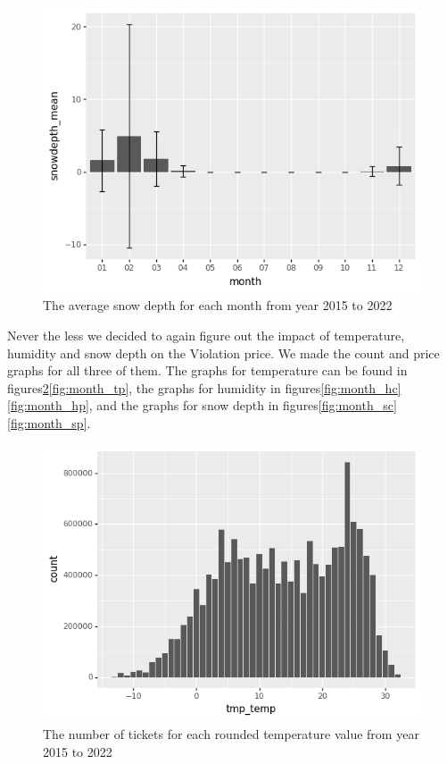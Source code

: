 \documentclass[12pt]{fphw}
\begin{document}
\begin{figure}[h!]
  \label{fig:month_s}
  \includegraphics[width=1\textwidth]{figures2/Month_snowdepth.png}
  \caption{The average snow depth for each month from year 2015 to 2022}
\end{figure}


Never the less we decided to again figure out the impact of temperature, humidity and snow depth on the Violation price.
We made the count and price graphs for all three of them. The graphs for temperature can be found in figures\ref{fig:month_tc}\ref{fig:month_tp}, the graphs for humidity in figures\ref{fig:month_hc}\ref{fig:month_hp}, and the graphs for snow depth in figures\ref{fig:month_sc}\ref{fig:month_sp}.

\begin{figure}[h!]
  \label{fig:month_tc}
  \includegraphics[width=1\textwidth]{figures2/Temp_count.png}
  \caption{The number of tickets for each rounded temperature value from year 2015 to 2022}
\end{figure}
\end{document}

